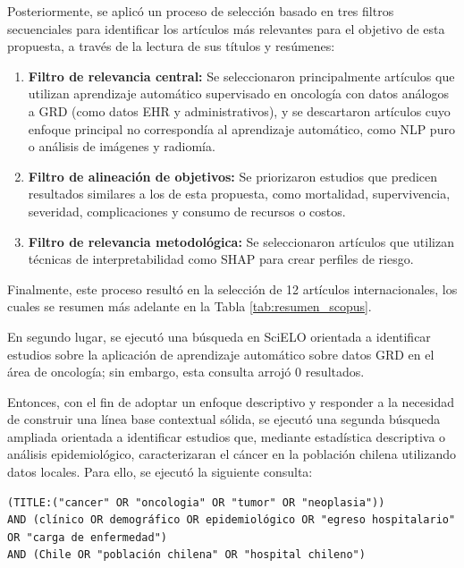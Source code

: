 Posteriormente, se aplicó un proceso de selección basado en tres filtros secuenciales para identificar los artículos más relevantes para el objetivo de esta propuesta, a través de la lectura de sus títulos y resúmenes:

\begin{enumerate}
    \item \textbf{Filtro de relevancia central:} Se seleccionaron principalmente artículos que utilizan aprendizaje automático supervisado en oncología con datos análogos a GRD (como datos EHR y administrativos), y se descartaron artículos cuyo enfoque principal no correspondía al aprendizaje automático, como NLP puro o análisis de imágenes y radiomía.

    \item \textbf{Filtro de alineación de objetivos:} Se priorizaron estudios que predicen resultados similares a los de esta propuesta, como mortalidad, supervivencia, severidad, complicaciones y consumo de recursos o costos.
    
    \item \textbf{Filtro de relevancia metodológica:} Se seleccionaron artículos que utilizan técnicas de interpretabilidad como SHAP para crear perfiles de riesgo.
\end{enumerate}

Finalmente, este proceso resultó en la selección de 12 artículos internacionales, los cuales se resumen más adelante en la Tabla \ref{tab:resumen_scopus}.

En segundo lugar, se ejecutó una búsqueda en SciELO orientada a identificar estudios sobre la aplicación de aprendizaje automático sobre datos GRD en el área de oncología; sin embargo, esta consulta arrojó 0 resultados.

Entonces, con el fin de adoptar un enfoque descriptivo y responder a la necesidad de construir una línea base contextual sólida, se ejecutó una segunda búsqueda ampliada orientada a identificar estudios que, mediante estadística descriptiva o análisis epidemiológico, caracterizaran el cáncer en la población chilena utilizando datos locales. Para ello, se ejecutó la siguiente consulta:

\begin{lstlisting}[style=query]
(TITLE:("cancer" OR "oncologia" OR "tumor" OR "neoplasia"))
AND (clínico OR demográfico OR epidemiológico OR "egreso hospitalario" OR "carga de enfermedad")
AND (Chile OR "población chilena" OR "hospital chileno")
\end{lstlisting}

